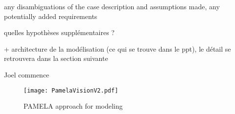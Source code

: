 any disambiguations of the  case  description and assumptions made, any potentially added requirements

quelles hypothèses supplémentaires ? 

+ architecture de la modélisation (ce qui se trouve dans le ppt), le détail se retrouvera dans la section suivante

Joel commence

\begin{figure}
    \centering
    \texttt{[image: PamelaVisionV2.pdf]}
    \caption{PAMELA approach for modeling}
    \label{fig:PamelaVision}
\end{figure}

